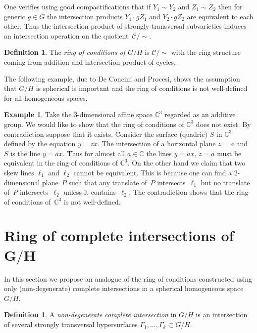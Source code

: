 \documentclass[pdftex]{sigma}
\def \C{\mathbb{C}}
\numberwithin{equation}{section}
\theoremstyle{definition}
\newtheorem{Ex}[Th]{Example}
\newtheorem{Def}[Th]{Definition}
\begin{document}
One verifies using good compactifications that if $Y_1 \sim Y_2$ and $Z_1 \sim Z_2$ then for generic $g\in G$ the intersection products $Y_1 \cdot gZ_1 $ and $Y_2 \cdot gZ_2$ are equivalent to each other. Thus the intersection product of strongly transversal subvarieties induces an intersection operation on the quotient~$\mathcal{C} /{\sim}$.

\begin{Def} \label{def-ring-of-conditions} The {\it ring of conditions of $G/H$} is $\mathcal{C} /{\sim}$ with the ring structure coming from addition and intersection product of cycles.
\end{Def}

The following example, due to De Concini and Procesi, shows the assumption that $G/H$ is spherical is important and the ring of conditions is not well-defined for all homogeneous spaces.
\begin{Ex} \label{ex-ring-of-cond-not-well-def}Take the $3$-dimensional affine space $\C^3$ regarded as an additive group. We would like to show that the ring of conditions of $\C^3$ does not exist. By contradiction suppose that it exists. Consider the surface (quadric) $S$ in $\C^3$ defined by the equation $y = zx$. The intersection of a horizontal plane $z=a$ and $S$ is the line $y=ax$. Thus for almost all $a\in \C$ the lines $y=ax$, $z=a$ must be equivalent in the ring of conditions of $\C^3$. On the other hand we claim that two skew lines $\ell_1$ and $\ell_2$ cannot be equivalent. This is because one can find a $2$-dimensional plane~$P$ such that any translate of~$P$ intersects~$\ell_1$ but no translate of~$P$ intersects~$\ell_2$ unless it contains~$\ell_2$. The contradiction shows that the ring of conditions of~$\C^3$ is not well-defined.
\end{Ex}

\section[Ring of complete intersections of $G/H$]{Ring of complete intersections of $\boldsymbol{G/H}$} \label{sec-ring-of-complete-intersec}

In this section we propose an analogue of the ring of conditions constructed using only (non-degenerate) complete intersections in a spherical homogeneous space~$G/H$.

\begin{Def} \label{def-non-degenerate-complete-intersection} A {\it non-degenerate complete intersection} in $G/H$ is an intersection of several strongly transversal hypersurfaces $\Gamma_1,\ldots, \Gamma_k\subset G/H$.
\end{Def}
\end{document}
